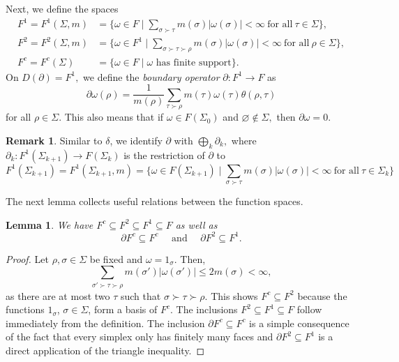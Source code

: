 \documentclass[10pt]{amsart}
\newtheorem{lemma}[theorem]{Lemma}
\theoremstyle{definition}
\newtheorem*{remark}{Remark}
\newcommand{\F}{{F}}
\begin{document}
Next, we define the spaces
\begin{align*}
	\F^1=	\F^1(\Sigma,m)& = \lbrace\omega\in \F\mid\sum_{\sigma\succ \tau}m(\sigma)\vert\omega(\sigma)\vert<\infty~\text{for all}~\tau\in\Sigma\rbrace,\\
	\F^2=	\F^2(\Sigma,m)& = \lbrace\omega\in \F^1\mid\sum_{\sigma\succ\tau\succ \rho}m(\sigma)\vert\omega(\sigma)\vert<\infty~\text{for all}~\rho\in\Sigma\rbrace,\\
	\F^c=	\F^c(\Sigma)&=\lbrace\omega\in \F\mid \omega \mbox{ has finite support}\rbrace.
\end{align*}
On $D(\partial)=\F^1,$ we define the \textit{boundary operator} $\partial:\F^1\rightarrow \F$ as
$$\partial\omega(\rho) = \frac{1}{m(\rho)}\sum_{\tau\succ \rho}m(\tau)\omega(\tau)\theta(\rho,\tau)$$ for all $\rho\in\Sigma.$ This also means that if $\omega\in F(\Sigma_0)$ and $\varnothing\notin\Sigma,$ then $\partial\omega = 0.$

\begin{remark}
    Similar to $\delta$, we identify $\partial$ with $\bigoplus_k\partial_k,$ where $\partial_k:\F^1(\Sigma_{k+1})\rightarrow \F(\Sigma_k)$ is the restriction of $\partial$ to $$F^1(\Sigma_{k+1}) = \F^1(\Sigma_{k+1},m) = \lbrace\omega\in \F(\Sigma_{k+1})\mid\sum_{\sigma\succ \tau}m(\sigma)\vert\omega(\sigma)\vert<\infty~\text{for all}~\tau\in\Sigma_k\rbrace$$
\end{remark}
 The next lemma collects useful relations between the function spaces.

\begin{lemma}\label{sammellemma1} We have $\F^c\subseteq \F^2\subseteq\F^1\subseteq \F$ as well as
      $$\partial \F^c\subseteq \F^c\quad\mbox{ and }\quad\partial \F^2\subseteq \F^1.$$
    \end{lemma}
\begin{proof}
    Let $\rho,\sigma\in \Sigma$ be fixed and $\omega = 1_{\sigma}.$ Then, 
    $$\sum_{\sigma'\succ\tau\succ \rho}m(\sigma')\vert\omega(\sigma')\vert \leq 2m(\sigma)<\infty,$$ as there are at most two $\tau$
 such that $\sigma\succ \tau\succ\rho.$ This shows $\F^{c}\subseteq \F^{2}$ because the functions $1_{\sigma}$, $\sigma\in \Sigma$, form a basis of $\F^c$. The inclusions $F^2\subseteq F^1\subseteq F$ follow immediately from the definition. The inclusion $\partial F^c\subseteq F^c$ is a simple consequence of the fact that every simplex only has finitely many faces and $\partial F^2\subseteq F^1$ is a direct application of the triangle inequality.
 \end{proof}
 
\end{document}
